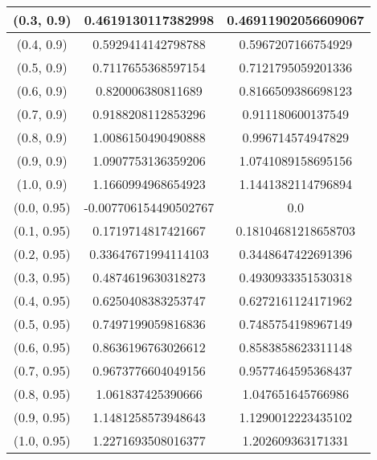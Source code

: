 \begin{table}[H]
\begin{tabular}{|c|c|c|}
\hline
(0.3, 0.9) & 0.4619130117382998 & 0.46911902056609067 \\
\hline
(0.4, 0.9) & 0.5929414142798788 & 0.5967207166754929 \\
\hline
(0.5, 0.9) & 0.7117655368597154 & 0.7121795059201336 \\
\hline
(0.6, 0.9) & 0.820006380811689 & 0.8166509386698123 \\
\hline
(0.7, 0.9) & 0.9188208112853296 & 0.911180600137549 \\
\hline
(0.8, 0.9) & 1.0086150490490888 & 0.996714574947829 \\
\hline
(0.9, 0.9) & 1.0907753136359206 & 1.0741089158695156 \\
\hline
(1.0, 0.9) & 1.1660994968654923 & 1.1441382114796894 \\
\hline
\hline
(0.0, 0.95) & -0.007706154490502767 & 0.0 \\
\hline
(0.1, 0.95) & 0.1719714817421667 & 0.18104681218658703 \\
\hline
(0.2, 0.95) & 0.33647671994114103 & 0.3448647422691396 \\
\hline
(0.3, 0.95) & 0.4874619630318273 & 0.4930933351530318 \\
\hline
(0.4, 0.95) & 0.6250408383253747 & 0.6272161124171962 \\
\hline
(0.5, 0.95) & 0.7497199059816836 & 0.7485754198967149 \\
\hline
(0.6, 0.95) & 0.8636196763026612 & 0.8583858623311148 \\
\hline
(0.7, 0.95) & 0.9673776604049156 & 0.9577464595368437 \\
\hline
(0.8, 0.95) & 1.061837425390666 & 1.047651645766986 \\
\hline
(0.9, 0.95) & 1.1481258573948643 & 1.1290012223435102 \\
\hline
(1.0, 0.95) & 1.2271693508016377 & 1.202609363171331 \\
\hline
\end{tabular}
\end{table}
